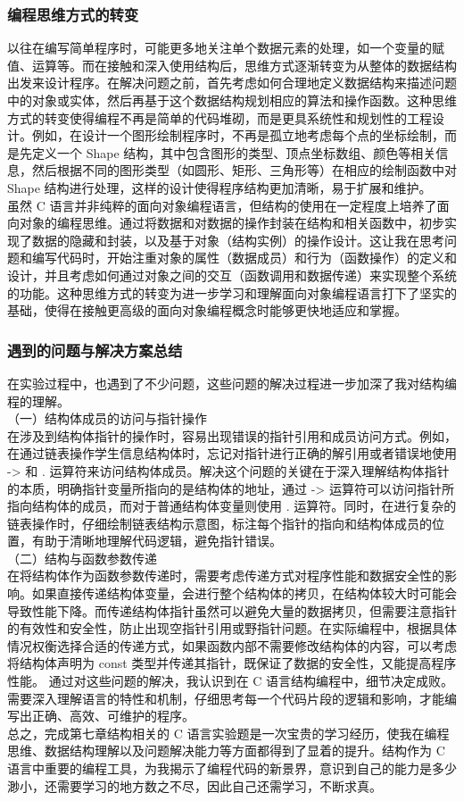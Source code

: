 \documentclass[supercite]{Experimental_Report}
\theoremstyle{definition}
\begin{document}
		\subsubsection{编程思维方式的转变}
		以往在编写简单程序时，可能更多地关注单个数据元素的处理，如一个变量的赋值、运算等。而在接触和深入使用结构后，思维方式逐渐转变为从整体的数据结构出发来设计程序。在解决问题之前，首先考虑如何合理地定义数据结构来描述问题中的对象或实体，然后再基于这个数据结构规划相应的算法和操作函数。这种思维方式的转变使得编程不再是简单的代码堆砌，而是更具系统性和规划性的工程设计。例如，在设计一个图形绘制程序时，不再是孤立地考虑每个点的坐标绘制，而是先定义一个 Shape 结构，其中包含图形的类型、顶点坐标数组、颜色等相关信息，然后根据不同的图形类型（如圆形、矩形、三角形等）在相应的绘制函数中对 Shape 结构进行处理，这样的设计使得程序结构更加清晰，易于扩展和维护。
		\\虽然 C 语言并非纯粹的面向对象编程语言，但结构的使用在一定程度上培养了面向对象的编程思维。通过将数据和对数据的操作封装在结构和相关函数中，初步实现了数据的隐藏和封装，以及基于对象（结构实例）的操作设计。这让我在思考问题和编写代码时，开始注重对象的属性（数据成员）和行为（函数操作）的定义和设计，并且考虑如何通过对象之间的交互（函数调用和数据传递）来实现整个系统的功能。这种思维方式的转变为进一步学习和理解面向对象编程语言打下了坚实的基础，使得在接触更高级的面向对象编程概念时能够更快地适应和掌握。
		\subsubsection{遇到的问题与解决方案总结}
		在实验过程中，也遇到了不少问题，这些问题的解决过程进一步加深了我对结构编程的理解。\\
		（一）结构体成员的访问与指针操作\\
		在涉及到结构体指针的操作时，容易出现错误的指针引用和成员访问方式。例如，在通过链表操作学生信息结构体时，忘记对指针进行正确的解引用或者错误地使用 -> 和 . 运算符来访问结构体成员。解决这个问题的关键在于深入理解结构体指针的本质，明确指针变量所指向的是结构体的地址，通过 -> 运算符可以访问指针所指向结构体的成员，而对于普通结构体变量则使用 . 运算符。同时，在进行复杂的链表操作时，仔细绘制链表结构示意图，标注每个指针的指向和结构体成员的位置，有助于清晰地理解代码逻辑，避免指针错误。\\
		（二）结构与函数参数传递\\
		在将结构体作为函数参数传递时，需要考虑传递方式对程序性能和数据安全性的影响。如果直接传递结构体变量，会进行整个结构体的拷贝，在结构体较大时可能会导致性能下降。而传递结构体指针虽然可以避免大量的数据拷贝，但需要注意指针的有效性和安全性，防止出现空指针引用或野指针问题。在实际编程中，根据具体情况权衡选择合适的传递方式，如果函数内部不需要修改结构体的内容，可以考虑将结构体声明为 const 类型并传递其指针，既保证了数据的安全性，又能提高程序性能。
		通过对这些问题的解决，我认识到在 C 语言结构编程中，细节决定成败。需要深入理解语言的特性和机制，仔细思考每一个代码片段的逻辑和影响，才能编写出正确、高效、可维护的程序。\\
		总之，完成第七章结构相关的 C 语言实验题是一次宝贵的学习经历，使我在编程思维、数据结构理解以及问题解决能力等方面都得到了显着的提升。结构作为 C 语言中重要的编程工具，为我揭示了编程代码的新景界，意识到自己的能力是多少渺小，还需要学习的地方数之不尽，因此自己还需学习，不断求真。
		
\end{document}
